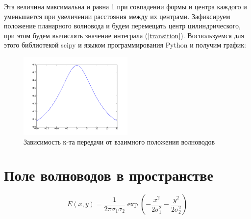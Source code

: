Эта величина максимальна и равна 1 при совпадении формы и центра каждого и уменьшается при увеличении расстояния между их центрами. Зафиксируем положение планарного волновода и будем перемещать центр цилиндрического, при этом будем вычислять значение интеграла (\ref{transition}). Воспользуемся для этого библиотекой scipy и языком программирования Python и получим график:
\begin{figure}[h!]
	\includegraphics[width=0.5\textwidth]{img/transition.png}
	\caption{Зависимость к-та передачи от взаимного положения волноводов}
\end{figure}

\section{Поле волноводов в пространстве}

\begin{equation}
  \label{gauss2d}
  E(x,y)=\frac{1}{2\pi\sigma_1\sigma_2}\exp\left(-\frac{x^2}{2\sigma_1^2}-\frac{y^2}{2\sigma_2^2}\right)
\end{equation}


